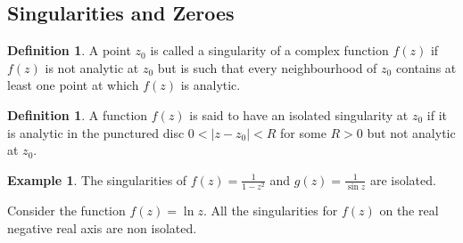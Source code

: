 \documentclass[11pt,a4paper]{article}
\theoremstyle{definition}
\newtheorem{definition}[thm]{Definition}
\newtheorem{example}[thm]{Example}
\begin{document}
{\color[wave]{485}\subsection{Singularities and Zeroes}}

\begin{definition}
A point $z_0$ is called a singularity of a complex function $f(z)$ if $f(z)$ is not analytic at $z_0$ but is such that every neighbourhood of $z_0$ contains at least one point at which $f(z)$ is analytic.
\end{definition}

\begin{definition}
A function $f(z)$ is said to have an isolated singularity at $z_0$ if it is analytic in the punctured disc $0 < \left|z - z_0\right| < R$ for some $R>0$ but not analytic at $z_0$.
\end{definition}

\begin{example}
The singularities of $f(z) = \frac{1}{1 - z^2}$ and $g(z) = \frac{1}{\sin z}$ are isolated.



\begin{figure}[H]
\centering
{}
\end{figure}










\begin{figure}[H]
\centering
{}
\end{figure}










Consider the function $f(z)  = \ln z$. All the singularities for $f(z)$ on the real negative real axis are non isolated.
\end{example}
\end{document}
